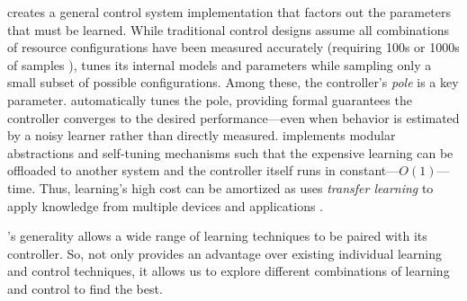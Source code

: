 \SYSTEM{} creates a general control system implementation that factors
out the parameters that must be learned.  While traditional control
designs assume all combinations of resource configurations have been
measured accurately (requiring 100s or 1000s of samples
\cite{sysid,FSE2015}), \SYSTEM{} tunes its internal models and
parameters while sampling only a small subset of possible
configurations.  Among these, the controller's \emph{pole} is a key
parameter.  \SYSTEM{} automatically tunes the pole, providing formal
guarantees the controller converges to the desired performance---even
when behavior is estimated by a noisy learner rather than directly
measured.  \SYSTEM{} implements modular abstractions and self-tuning
mechanisms such that the expensive learning can be offloaded to
another system and the controller itself runs in
constant---$O(1)$---time.  Thus, learning's high cost can be amortized
as \SYSTEM{} uses \emph{transfer learning} to apply knowledge from
multiple devices and applications \cite{pan2010survey}.

\SYSTEM{}'s generality allows a wide range of learning techniques to
be paired with its controller.  So, \SYSTEM{} not only provides an
advantage over existing individual learning and control techniques, it
allows us to explore different combinations of learning and control to
find the best.

